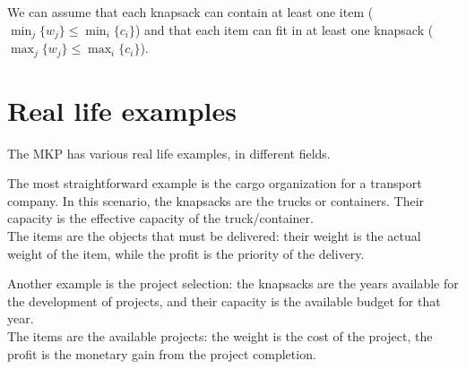 We can assume that each knapsack can contain at least one item (\(\min_{j}\{w_{j}\} \leq \min_{i}\{c_{i}\}\))
and that each item can fit in at least one knapsack (\(\max_{j}\{w_{j}\} \leq \max_{i}\{c_{i}\}\)).

\section{Real life examples}
The MKP has various real life examples, in different fields.

The most straightforward example is the cargo organization for a transport company.
In this scenario, the knapsacks are the trucks or containers.
Their capacity is the effective capacity of the truck/container.\\
The items are the objects that must be delivered:
their weight is the actual weight of the item, while the profit is the priority of the delivery.

Another example is the project selection: the knapsacks are
the years available for the development of projects,
and their capacity is the available budget for that year.\\
The items are the available projects: the weight is the cost of the project, the profit is the monetary gain
from the project completion.